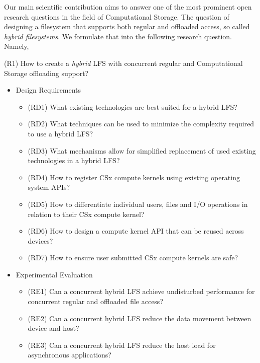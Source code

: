 Our main scientific contribution aims to answer one of the most prominent open
research questions in the field of Computational Storage. The question of
designing a filesystem that supports both regular and offloaded access, so
called \textit{hybrid filesystems}. We formulate that into the following
research question. Namely,

\begin{displayquote}
    (R1) How to create a \textit{hybrid} LFS with concurrent regular and 
    Computational Storage offloading support?
\end{displayquote}


\begin{itemize}
    \item Design Requirements
    \begin{itemize}
        \item (RD1) What existing technologies are best suited for a hybrid LFS?
        \item (RD2) What techniques can be used to minimize the complexity
              required to use a hybrid LFS?
        \item (RD3) What mechanisms allow for simplified replacement of used
              existing technologies in a hybrid LFS?
        \item (RD4) How to register CSx compute kernels using existing operating 
              system APIs?
        \item (RD5) How to differentiate individual users, files and I/O
              operations in relation to their CSx compute kernel?
        \item (RD6) How to design a compute kernel API that can be reused across
              devices?
        \item (RD7) How to ensure user submitted CSx compute kernels are safe?
    \end{itemize}
    \item Experimental Evaluation
    \begin{itemize}
        \item (RE1) Can a concurrent hybrid LFS achieve undisturbed performance
              for concurrent regular and offloaded file access?
        \item (RE2) Can a concurrent hybrid LFS reduce the data movement
              between device and host?
        \item (RE3) Can a concurrent hybrid LFS reduce the host load for
              asynchronous applications?
    \end{itemize}
\end{itemize}

